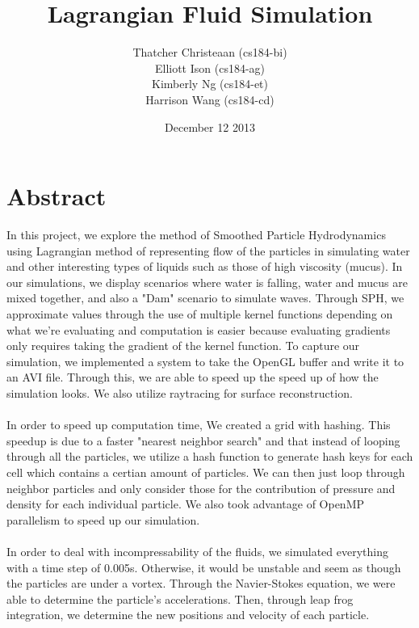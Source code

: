 \documentclass{article}
\title{\textbf{Lagrangian Fluid Simulation}}
\author{Thatcher Christeaan (cs184-bi)\\
       Elliott Ison (cs184-ag)\\
       Kimberly Ng (cs184-et)\\
       Harrison Wang (cs184-cd)\\}
\date{December 12 2013}
\begin{document}
\maketitle

\section{Abstract}
 In this project, we explore the method of Smoothed Particle Hydrodynamics using Lagrangian method of representing flow of the particles in simulating water and other interesting types of liquids such as those of high viscosity (mucus). In our simulations, we display scenarios where water is falling, water and mucus are mixed together, and also a "Dam" scenario to simulate waves. Through SPH, we approximate values through the use of multiple kernel functions depending on what we're evaluating and computation is easier because evaluating gradients only requires taking the gradient of the kernel function. To capture our simulation, we implemented a system to take the OpenGL buffer and write it to an AVI file. Through this, we are able to speed up the speed up of how the simulation looks. We also utilize raytracing for surface reconstruction.\\\\
 
  In order to speed up computation time, We created a grid with hashing. This speedup is due to a faster "nearest neighbor search" and that instead of looping through all the particles, we utilize a hash function to generate hash keys for each cell which contains a certian amount of particles. We can then just loop through neighbor particles and only consider those for the contribution of pressure and density for each individual particle. We also took advantage of OpenMP parallelism to speed up our simulation.\\\\
  
  
  In order to deal with incompressability of the fluids, we simulated
  everything with a time step of 0.005s. Otherwise, it would be unstable and seem as though the particles are under a vortex. Through the Navier-Stokes equation, we were able to determine the particle's accelerations. Then, through leap frog integration, we determine the new positions and velocity of each particle. 
\end{document}
